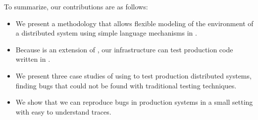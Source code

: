To summarize, our contributions are as follows:
\begin{itemize}
\item We present a methodology that allows flexible modeling of the environment of a distributed system using simple language mechanisms in \psharp.
\item Because \psharp is an extension of \csharp, our infrastructure can test production code written in \csharp.
\item We present three case studies of using \psharp to test production distributed systems, finding bugs that could not be found with traditional testing techniques.
\item We show that we can reproduce bugs in production systems in a small setting with easy to understand traces.
\end{itemize}

